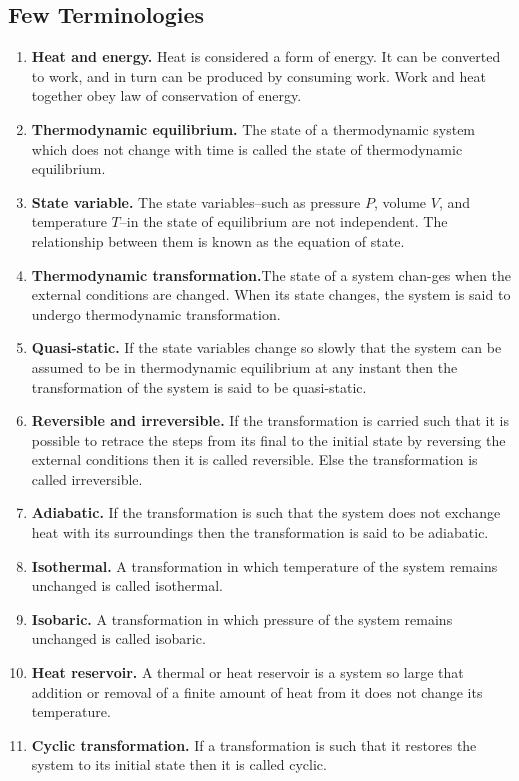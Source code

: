 \documentclass[../../../Main.tex]{subfiles}
\begin{document}
\subsection*{Few Terminologies}
\begin{enumerate}
    \item \textbf{Heat and energy.} Heat is considered a form of energy. It can be converted to work, and in turn can be produced by consuming work. Work and heat together obey law of conservation of energy.
    \item \textbf{Thermodynamic equilibrium.} The state of a thermodynamic system which does not change with time is called the state of thermodynamic equilibrium.
    \item \textbf{State variable.} The state variables--such as pressure $P$, volume $V$, and temperature $T$--in the state of equilibrium are not independent. The relationship between them is known as the equation of state.
    \item \textbf{Thermodynamic transformation.}The state of a system chan-ges when the external conditions are changed. When its state changes, the system is said to undergo thermodynamic transformation.
    \item \textbf{Quasi-static.} If the state variables change so slowly that the system can be assumed to be in thermodynamic equilibrium at any instant then the transformation of the system is said to be quasi-static.
    \item \textbf{Reversible and irreversible.} If the transformation is carried such that it is possible to retrace the steps from its final to the initial state by reversing the external conditions then it is called reversible. Else the transformation is called irreversible.
    \item \textbf{Adiabatic.} If the transformation is such that the system does not exchange heat with its surroundings then the transformation is said to be adiabatic.
    \item \textbf{Isothermal.} A transformation in which temperature of the system remains unchanged is called isothermal.
    \item \textbf{Isobaric.} A transformation in which pressure of the system remains unchanged is called
    isobaric.
    \item \textbf{Heat reservoir.} A thermal or heat reservoir is a system so large that addition or removal of a finite amount of heat from it does not change its temperature.
    \item \textbf{Cyclic transformation.} If a transformation is such that it restores the system to its initial state then it is called cyclic. 
\end{enumerate}
\end{document}
